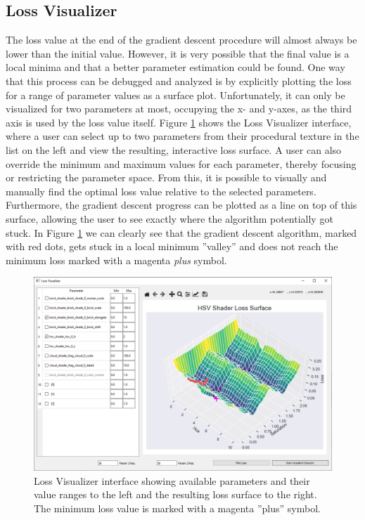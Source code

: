 \subsection{Loss Visualizer}\label{sec:LossVisualizerInterface}

The loss value at the end of the gradient descent procedure will almost always be lower than the initial value. However, it is very possible that the final value is a local minima and that a better parameter estimation could be found. One way that this process can be debugged and analyzed is by explicitly plotting the loss for a range of parameter values as a surface plot. Unfortunately, it can only be visualized for two parameters at most, occupying the x- and y-axes, as the third axis is used by the loss value itself. Figure \ref{fig:LossVisualizer} shows the Loss Visualizer interface, where a user can select up to two parameters from their procedural texture in the list on the left and view the resulting, interactive loss surface. A user can also override the minimum and maximum values for each parameter, thereby focusing or restricting the parameter space. From this, it is possible to visually and manually find the optimal loss value relative to the selected parameters. Furthermore, the gradient descent progress can be plotted as a line on top of this surface, allowing the user to see exactly where the algorithm potentially got stuck. In Figure \ref{fig:LossVisualizer} we can clearly see that the gradient descent algorithm, marked with red dots, gets stuck in a local minimum ''valley'' and does not reach the minimum loss marked with a magenta \textit{plus} symbol.

\begin{figure}[!h]
    \centering
    \includegraphics[width=.9\textwidth]{img/method/Loss Visualizer v3.PNG}
    \caption{Loss Visualizer interface showing available parameters and their value ranges to the left and the resulting loss surface to the right. The minimum loss value is marked with a magenta ''plus'' symbol.}
    \label{fig:LossVisualizer}
\end{figure}